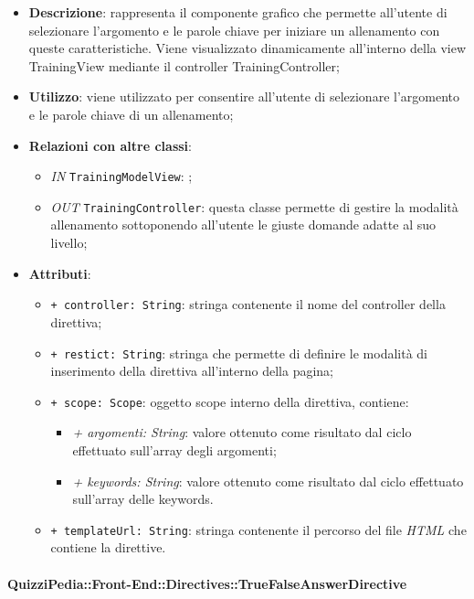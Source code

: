 		\begin{itemize}
			\item \textbf{Descrizione}: rappresenta il componente grafico che permette all'utente di selezionare l'argomento e le parole chiave per iniziare un allenamento con queste caratteristiche. Viene visualizzato dinamicamente all'interno della view TrainingView mediante il controller TrainingController;
			\item \textbf{Utilizzo}: viene utilizzato per consentire all'utente di selezionare l'argomento e le parole chiave di un allenamento;
			\item \textbf{Relazioni con altre classi}: 
			\begin{itemize}
				\item \textit{IN} \texttt{TrainingModelView}: ; 
				\item \textit{OUT} \texttt{TrainingController}: questa classe permette di gestire la modalità allenamento sottoponendo all'utente le giuste domande adatte al suo livello;
			\end{itemize}
			\item \textbf{Attributi}: 
			\begin{itemize}
				\item \texttt{+ controller: String}: stringa contenente il nome del controller della direttiva;
				\item \texttt{+ restict: String}: stringa che permette di definire le modalità di inserimento della direttiva all'interno della pagina;
				\item \texttt{+ scope: Scope}: oggetto scope interno della direttiva, contiene:
				\begin{itemize}
					\item \textit{+ argomenti: String}: valore ottenuto come risultato dal ciclo effettuato sull'array degli argomenti;
					\item \textit{+ keywords: String}: valore ottenuto come risultato dal ciclo effettuato sull'array delle keywords.
				\end{itemize}
				\item \texttt{+ templateUrl: String}: stringa contenente il percorso del file \textit{HTML} che contiene la direttive.
			\end{itemize}
		\end{itemize}
		
		\paragraph{QuizziPedia::Front-End::Directives::TrueFalseAnswerDirective}
		
